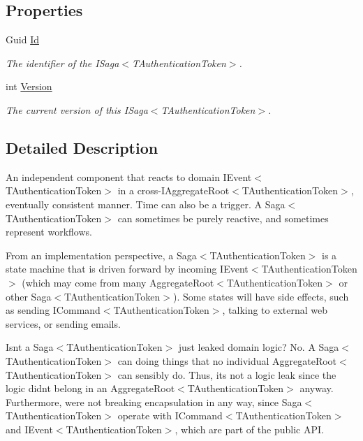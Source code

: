 \subsection*{Properties}
\begin{DoxyCompactItemize}
\item 
Guid \hyperlink{interfaceCqrs_1_1Domain_1_1ISaga_aa470a39d3bcdc506dbd5bf49d127bc3c_aa470a39d3bcdc506dbd5bf49d127bc3c}{Id}
\begin{DoxyCompactList}\small\item\em The identifier of the I\+Saga$<$\+T\+Authentication\+Token$>$. \end{DoxyCompactList}\item 
int \hyperlink{interfaceCqrs_1_1Domain_1_1ISaga_a83a02ff45543d670356dde4149cdc614_a83a02ff45543d670356dde4149cdc614}{Version}
\begin{DoxyCompactList}\small\item\em The current version of this I\+Saga$<$\+T\+Authentication\+Token$>$. \end{DoxyCompactList}\end{DoxyCompactItemize}


\subsection{Detailed Description}
An independent component that reacts to domain I\+Event$<$\+T\+Authentication\+Token$>$ in a cross-\/I\+Aggregate\+Root$<$\+T\+Authentication\+Token$>$, eventually consistent manner. Time can also be a trigger. A Saga$<$\+T\+Authentication\+Token$>$ can sometimes be purely reactive, and sometimes represent workflows. 

From an implementation perspective, a Saga$<$\+T\+Authentication\+Token$>$ is a state machine that is driven forward by incoming I\+Event$<$\+T\+Authentication\+Token$>$ (which may come from many Aggregate\+Root$<$\+T\+Authentication\+Token$>$ or other Saga$<$\+T\+Authentication\+Token$>$). Some states will have side effects, such as sending I\+Command$<$\+T\+Authentication\+Token$>$, talking to external web services, or sending emails. 

Isn\textquotesingle{}t a Saga$<$\+T\+Authentication\+Token$>$ just leaked domain logic? No. A Saga$<$\+T\+Authentication\+Token$>$ can doing things that no individual Aggregate\+Root$<$\+T\+Authentication\+Token$>$ can sensibly do. Thus, it\textquotesingle{}s not a logic leak since the logic didn\textquotesingle{}t belong in an Aggregate\+Root$<$\+T\+Authentication\+Token$>$ anyway. Furthermore, we\textquotesingle{}re not breaking encapsulation in any way, since Saga$<$\+T\+Authentication\+Token$>$ operate with I\+Command$<$\+T\+Authentication\+Token$>$ and I\+Event$<$\+T\+Authentication\+Token$>$, which are part of the public A\+PI.

